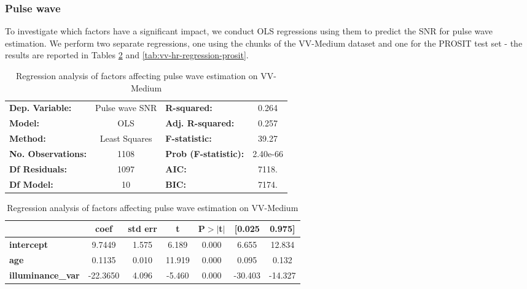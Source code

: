 \documentclass{article}
\begin{document}
\subsubsection{Pulse wave}

To investigate which factors have a significant impact, we conduct OLS regressions using them to predict the SNR for pulse wave estimation.
We perform two separate regressions, one using the chunks of the VV-Medium dataset and one for the PROSIT test set - the results are reported in Tables \ref{tab:vv-hr-regression-vv} and \ref{tab:vv-hr-regression-prosit}.

\begin{table}[h!]
\begin{center}
\caption{Regression analysis of factors affecting pulse wave estimation on VV-Medium}
\label{tab:vv-hr-regression-vv}
\begin{tabular}{lclc}
\toprule
\textbf{Dep. Variable:}          &  Pulse wave SNR  & \textbf{  R-squared:         } &     0.264   \\
\textbf{Model:}                  &       OLS        & \textbf{  Adj. R-squared:    } &     0.257   \\
\textbf{Method:}                 &  Least Squares   & \textbf{  F-statistic:       } &     39.27   \\
\textbf{No. Observations:}       &        1108      & \textbf{  Prob (F-statistic):} &  2.40e-66   \\
\textbf{Df Residuals:}           &        1097      & \textbf{  AIC:               } &     7118.   \\
\textbf{Df Model:}               &          10      & \textbf{  BIC:               } &     7174.   \\
\bottomrule
\end{tabular}
\begin{tabular}{lcccccc}
                                 & \textbf{coef} & \textbf{std err} & \textbf{t} & \textbf{P$> |$t$|$} & \textbf{[0.025} & \textbf{0.975]}  \\
\midrule
\textbf{intercept}               &       9.7449  &        1.575     &     6.189  &         0.000        &        6.655    &       12.834     \\
\textbf{age}                     &       0.1135  &        0.010     &    11.919  &         0.000        &        0.095    &        0.132     \\
\textbf{illuminance\_var}        &     -22.3650  &        4.096     &    -5.460  &         0.000        &      -30.403    &      -14.327     \\

\end{tabular}
\end{center}
\end{table}
\end{document}
